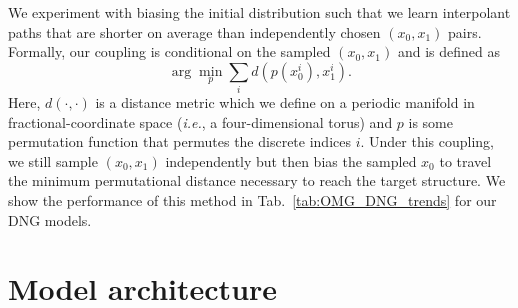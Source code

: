 

We experiment with biasing the initial distribution such that we learn interpolant paths that are shorter on average than independently chosen $(x_0,x_1)$ pairs. 
Formally, our coupling is conditional on the sampled $(x_0,x_1)$ and is defined as
\begin{equation}
    \arg \min_{p} \sum_{i} d(p(x_{0}^i), x_{1}^i).
\end{equation}
Here, $d(\cdot, \cdot)$ is a distance metric which we define on a periodic manifold in fractional-coordinate space (\textit{i.e.}, a four-dimensional torus) and $p$ is some permutation function that permutes the discrete indices $i$. Under this coupling, we still sample $(x_0, x_1)$ independently but then bias the sampled $x_0$ to travel the minimum permutational distance necessary to reach the target structure. 
We show the performance of this method in Tab.~\ref{tab:OMG_DNG_trends} for our DNG models.


\section{Model architecture}

